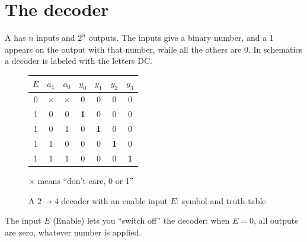 \section{The decoder}

A  has $n$ inputs and $2^n$ outputs. The inputs give
a binary number, and a 1 appears on the output with that number, while all the others
are 0. In schematics a decoder is labeled with the letters DC.

\begin{figure}[H]
\centering
\begin{minipage}{0.4\textwidth}
\centering
{}
\end{minipage}\hfill
\begin{minipage}{0.56\textwidth}
\centering
\begin{tabular}{ccc|cccc}
\toprule
$E$ & $a_1$ & $a_0$ & $y_0$ & $y_1$ & $y_2$ & $y_3$ \\
\midrule
0 & $\times$ & $\times$ & 0 & 0 & 0 & 0 \\
1 & 0 & 0 & \textbf{1} & 0 & 0 & 0 \\
1 & 0 & 1 & 0 & \textbf{1} & 0 & 0 \\
1 & 1 & 0 & 0 & 0 & \textbf{1} & 0 \\
1 & 1 & 1 & 0 & 0 & 0 & \textbf{1} \\
\bottomrule
\end{tabular}

\smallskip
{\small $\times$ means ``don't care, 0 or 1''}
\end{minipage}
\caption{A $2\to4$ decoder with an enable input $E$: symbol and truth table}
\label{fig:dc24}
\end{figure}

The input $E$ (Enable) lets you ``switch off'' the decoder: when $E=0$,
all outputs are zero, whatever number is applied.

